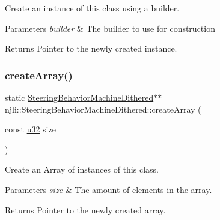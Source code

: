 Create an instance of this class using a builder.


\begin{DoxyParams}{Parameters}
{\em builder} & The builder to use for construction\\
\hline
\end{DoxyParams}
\begin{DoxyReturn}{Returns}
Pointer to the newly created instance. 
\end{DoxyReturn}
\mbox{\label{classnjli_1_1_steering_behavior_machine_dithered_a42e026ffce4751ecc02a859067698190}} 
\subsubsection{\texorpdfstring{create\+Array()}{createArray()}}
{\footnotesize\ttfamily static \mbox{\hyperlink{classnjli_1_1_steering_behavior_machine_dithered}{Steering\+Behavior\+Machine\+Dithered}}$\ast$$\ast$ njli\+::\+Steering\+Behavior\+Machine\+Dithered\+::create\+Array (\begin{DoxyParamCaption}\item[{const \mbox{\hyperlink{_util_8h_a10e94b422ef0c20dcdec20d31a1f5049}{u32}}}]{size }\end{DoxyParamCaption})\hspace{0.3cm}{\ttfamily [static]}}

Create an Array of instances of this class.


\begin{DoxyParams}{Parameters}
{\em size} & The amount of elements in the array.\\
\hline
\end{DoxyParams}
\begin{DoxyReturn}{Returns}
Pointer to the newly created array. 
\end{DoxyReturn}
\mbox{\label{classnjli_1_1_steering_behavior_machine_dithered_a47e6bda038144ca774b2228e6c7a9599}} 
